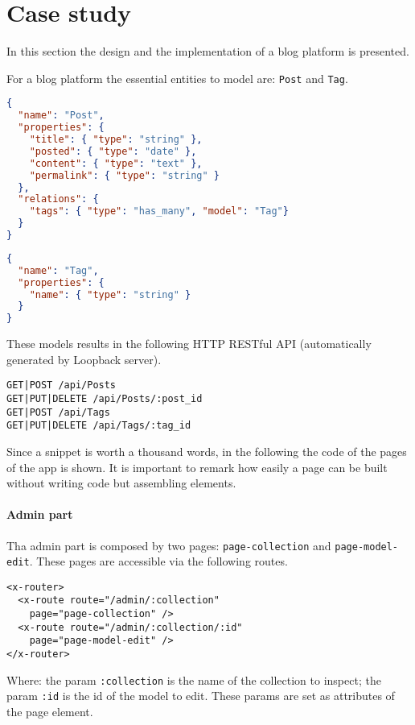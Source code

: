 \section{Case study}\label{sec:case-study}
In this section the design and the implementation of a blog platform is presented. 

For a blog platform the essential entities to model are: \texttt{Post} and \texttt{Tag}.

\begin{lstlisting}[language=json]
{
  "name": "Post",
  "properties": {
    "title": { "type": "string" },
    "posted": { "type": "date" },
    "content": { "type": "text" },
    "permalink": { "type": "string" }
  }, 
  "relations": {
    "tags": { "type": "has_many", "model": "Tag"}
  }
}
\end{lstlisting}

\begin{lstlisting}[language=json]
{
  "name": "Tag",
  "properties": {
    "name": { "type": "string" }
  }
}
\end{lstlisting}

These models results in the following HTTP RESTful API (automatically generated by Loopback server).

\begin{lstlisting}
GET|POST /api/Posts
GET|PUT|DELETE /api/Posts/:post_id
GET|POST /api/Tags
GET|PUT|DELETE /api/Tags/:tag_id
\end{lstlisting}

Since a snippet is worth a thousand words, in the following the code of the pages of the app is shown.
It is important to remark how easily a page can be built without writing code but assembling elements. 

\paragraph{Admin part}

Tha admin part is composed by two pages: \texttt{page-collection} and \texttt{page-model-edit}.
These pages are accessible via the following routes.

\begin{lstlisting}[language=HTML5]
<x-router>
  <x-route route="/admin/:collection" 
    page="page-collection" />
  <x-route route="/admin/:collection/:id"
    page="page-model-edit" />
</x-router>
\end{lstlisting}

Where:
the param \texttt{:collection} is the name of the collection to inspect;
the param \texttt{:id} is the id of the model to edit.
These params are set as attributes of the page element.

